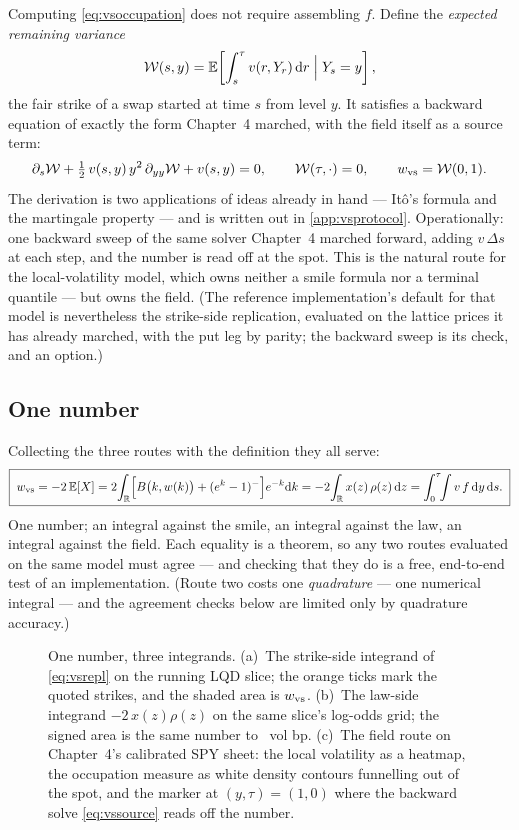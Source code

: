 Computing \eqref{eq:vsoccupation} does not require assembling $f$.
Define the \emph{expected remaining variance}
\[
\mathcal{W}(s,y)
=\mathbb{E}\!\left[\int_s^{\tau}v(r,Y_r)\,\mathrm{d} r\;\Big|\;Y_s=y\right],
\]
the fair strike of a swap started at time $s$ from level $y$.  It
satisfies a backward equation of exactly the form Chapter~4 marched,
with the field itself as a source term:
\begin{equation}
\partial_s\mathcal{W}
+\tfrac12\,v(s,y)\,y^{2}\,\partial_{yy}\mathcal{W}
+v(s,y)=0,
\qquad
\mathcal{W}(\tau,\cdot)=0,
\qquad
w_{\rm vs}=\mathcal{W}(0,1).
\label{eq:vssource}
\end{equation}
The derivation is two applications of ideas already in hand ---
It\^o's formula and the martingale property --- and is written out in
\cref{app:vsprotocol}.  Operationally: one backward sweep of the same
solver Chapter~4 marched forward, adding
$v\,\Delta s$ at each step, and the number is read off at the spot.
This is the natural route for the local-volatility model, which owns
neither a smile formula nor a terminal quantile --- but owns the
field.  (The reference implementation's default for that model is
nevertheless the strike-side replication, evaluated on the lattice
prices it has already marched, with the put leg by parity; the
backward sweep is its check, and an option.)

\subsection{One number}

Collecting the three routes with the definition they all serve:
\begin{equation}
\boxed{\;
w_{\rm vs}
=-2\,\mathbb{E}[X]
=2\!\int_{\mathbb{R}}\!\Big[B\big(k,w(k)\big)+(e^{k}-1)^-\Big]e^{-k}\mathrm{d} k
=-2\!\int_{\mathbb{R}}x(z)\,\rho(z)\,\mathrm{d} z
=\int_0^{\tau}\!\!\int v\,f\,\mathrm{d} y\,\mathrm{d} s .
\;}
\label{eq:vsmaster}
\end{equation}
One number; an integral against the smile, an integral against the
law, an integral against the field.  Each equality is a theorem, so
any two routes evaluated on the same model must agree --- and
checking that they do is a free, end-to-end test of an
implementation.  (Route two costs one \emph{quadrature} --- one
numerical integral --- and the agreement checks below are limited only
by quadrature accuracy.)

\begin{figure}[htbp]
\centering
{}
\caption{One number, three integrands.  (a)~The strike-side integrand
of \eqref{eq:vsrepl} on the running LQD slice; the orange ticks mark
the quoted strikes, and the shaded area is $w_{\rm vs}$.  (b)~The
law-side integrand $-2\,x(z)\rho(z)$ on the same slice's log-odds
grid; the signed area is the same number to \MacVsAgreeRankBp\ vol bp.
(c)~The field route on Chapter~4's calibrated SPY sheet: the local
volatility as a heatmap, the occupation measure as white density
contours funnelling out of the spot, and the marker at
$(y,\tau)=(1,0)$ where the backward solve \eqref{eq:vssource} reads
off the number.}
\label{fig:vsthree}
\end{figure}

